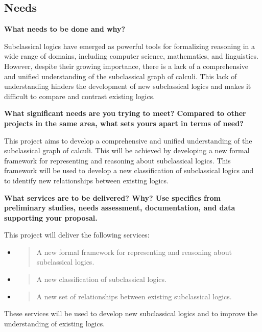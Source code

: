 \hypertarget{needs}{%
\subsection{Needs}\label{needs}}

\textbf{What needs to be done and why?}

Subclassical logics have emerged as powerful tools for formalizing
reasoning in a wide range of domains, including computer science,
mathematics, and linguistics. However, despite their growing importance,
there is a lack of a comprehensive and unified understanding of the
subclassical graph of calculi. This lack of understanding hinders the
development of new subclassical logics and makes it difficult to compare
and contrast existing logics.

\textbf{What significant needs are you trying to meet? Compared to other
projects in the same area, what sets yours apart in terms of need?}

This project aims to develop a comprehensive and unified understanding
of the subclassical graph of calculi. This will be achieved by
developing a new formal framework for representing and reasoning about
subclassical logics. This framework will be used to develop a new
classification of subclassical logics and to identify new relationships
between existing logics.

\textbf{What services are to be delivered? Why? Use specifics from
preliminary studies, needs assessment, documentation, and data
supporting your proposal.}

This project will deliver the following services:

\begin{itemize}
\item
  \begin{quote}
  A new formal framework for representing and reasoning about
  subclassical logics.
  \end{quote}
\item
  \begin{quote}
  A new classification of subclassical logics.
  \end{quote}
\item
  \begin{quote}
  A new set of relationships between existing subclassical logics.
  \end{quote}
\end{itemize}

These services will be used to develop new subclassical logics and to
improve the understanding of existing logics.

